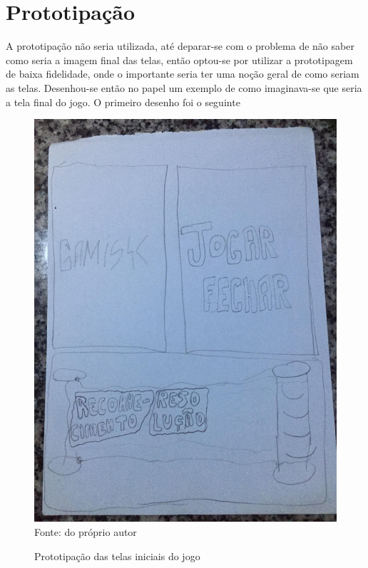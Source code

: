 \section[Prototipação]{Prototipação}

A prototipação não seria utilizada, até deparar-se com o problema de não saber como seria a imagem final das telas, então optou-se por utilizar a prototipagem de baixa fidelidade, onde o importante seria ter uma noção geral de como seriam as telas. Desenhou-se então no papel um exemplo de como imaginava-se que seria a tela final do jogo. O primeiro desenho foi o seguinte

\begin{figure}[H]
\centering
\caption{Prototipação das telas iniciais do jogo}
\label{prot0}
\includegraphics[scale=0.14]{figuras/prot0.jpg}
\\
\small{Fonte: do próprio autor}
\end{figure}

